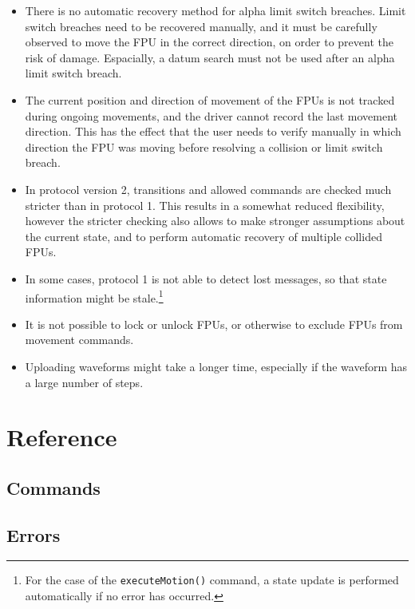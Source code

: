 \documentclass{scrartcl}[12pt,a4paper]
\begin{document}
\begin{itemize}
\item There is no automatic recovery method for alpha
  limit switch breaches. Limit switch breaches need
  to be recovered manually, and it must be carefully
  observed to move the FPU in the correct direction,
  on order to prevent the risk of damage. Espacially,
  a datum search must not be used after an alpha limit switch
  breach.

\item The current position and direction of movement of the FPUs is
  not tracked during ongoing movements, and the driver cannot record
  the last movement direction. This has the effect that the user needs
  to verify manually in which direction the FPU was moving before
  resolving a collision or limit switch breach.

\item In protocol version 2, transitions and allowed commands are
  checked much stricter than in protocol 1.  This results in a
  somewhat reduced flexibility, however the stricter checking also
  allows to make stronger assumptions about the current state, and to
  perform automatic recovery of multiple collided FPUs.
  
\item In some cases, protocol 1 is not able to
  detect lost messages, so that state information
  might be stale.\footnote{For the case of the \texttt{executeMotion()}
  command, a state update is performed automatically
  if no error has occurred.}

\item It is not possible to lock or unlock FPUs, or otherwise to
  exclude FPUs from movement commands.
  
\item Uploading waveforms might take a longer time, especially if the
  waveform has a large number of steps.
  
\end{itemize}


\section{Reference}
\subsection{Commands}
\subsection{Errors}
\end{document}
